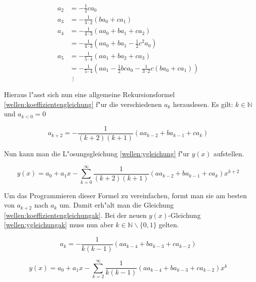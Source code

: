 \begin{refsection}
\begin{equation}
	\begin{split}
		a_2
		&=
		-\frac{1}{2}ca_0 \\
		a_3
		&=
		-\frac{1}{3 \cdot 2} (ba_0 + ca_1) \\
		a_4
		&=
		-\frac{1}{4 \cdot 3} (aa_0 + ba_1 + ca_2) \\
		&=
		-\frac{1}{4 \cdot 3} (aa_0 + ba_1 -\frac{1}{2}c^2a_0) \\
		a_5
		&=
		-\frac{1}{5 \cdot 4} (aa_1 + ba_2 + ca_3) \\
		&=
		-\frac{1}{5 \cdot 4} (aa_1 -\frac{1}{2}bca_0 -\frac{1}{3 \cdot 2} 
		c(ba_0 + ca_1)) \\
		&\hspace{5pt}\vdots
	\end{split}
	\label{wellen:aks}
\end{equation}

Hieraus l"asst sich nun eine allgemeine Rekursionsformel 
\ref{wellen:koeffizientengleichung} f"ur die verschiedenen $a_k$ herauslesen. 
Es gilt: $k \in \mathbb{N}$ und	$a_{k < 0} = 0$

\begin{equation}
	a_{k+2} = -\frac{1}{(k+2)(k+1)} (aa_{k-2}+ba_{k-1}+ca_k)
	\label{wellen:koeffizientengleichung}
\end{equation}

Nun kann man die L"osungsgleichung \ref{wellen:ygleichung} f"ur $y(x)$ 
aufstellen.

\begin{equation}
	y(x) = a_0 + a_1x 
	-\sum_{k=0}^{\infty}\frac{1}{(k+2)(k+1)}(aa_{k-2}+ba_{k-1}+ca_k)x^{k+2}
	\label{wellen:ygleichung}
\end{equation}

Um das Programmieren dieser Formel zu vereinfachen, formt man sie am besten von 
$a_{k+2}$ nach $a_k$ um. Damit erh"alt man die Gleichung 
\ref{wellen:koeffizientengleichungak}.
Bei der neuen $y(x)$-Gleichung \ref{wellen:ygleichungak} muss nun aber $k \in 
\mathbb{N} \backslash \{0, 1\}$ gelten.

\begin{equation}
	a_{k} = -\frac{1}{k(k-1)} (aa_{k-4}+ba_{k-3}+ca_{k-2})
	\label{wellen:koeffizientengleichungak}
\end{equation}

\begin{equation}
	y(x) = a_0 + a_1x 
	-\sum_{k=2}^{\infty}\frac{1}{k(k-1)}(aa_{k-4}+ba_{k-3}+ca_{k-2})x^k
	\label{wellen:ygleichungak}
\end{equation}


\end{refsection}
